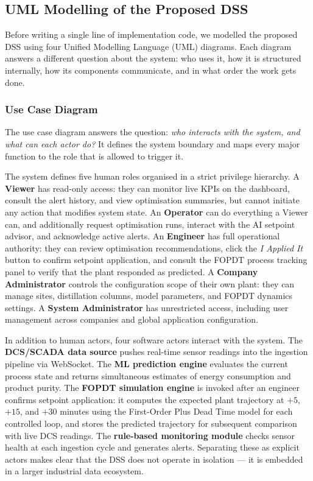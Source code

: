 \subsection{UML Modelling of the Proposed DSS}
\label{sec:uml_modeling}

Before writing a single line of implementation code, we modelled the
proposed DSS using four Unified Modelling Language (UML) diagrams.
Each diagram answers a different question about the system: who uses
it, how it is structured internally, how its components communicate,
and in what order the work gets done.

\subsubsection{Use Case Diagram}

The use case diagram answers the question: \textit{who interacts with
the system, and what can each actor do?}  It defines the system
boundary and maps every major function to the role that is allowed
to trigger it.

The system defines five human roles organised in a strict privilege
hierarchy.  A \textbf{Viewer} has read-only access: they can monitor
live KPIs on the dashboard, consult the alert history, and view
optimisation summaries, but cannot initiate any action that modifies
system state.  An \textbf{Operator} can do everything a Viewer can,
and additionally request optimisation runs, interact with the AI
setpoint advisor, and acknowledge active alerts.  An
\textbf{Engineer} has full operational authority: they can review
optimisation recommendations, click the \textit{I Applied It} button
to confirm setpoint application, and consult the FOPDT process
tracking panel to verify that the plant responded as predicted.  A
\textbf{Company Administrator} controls the configuration scope of
their own plant: they can manage sites, distillation columns, model
parameters, and FOPDT dynamics settings.  A \textbf{System
Administrator} has unrestricted access, including user management
across companies and global application configuration.

In addition to human actors, four software actors interact with the
system.  The \textbf{DCS/SCADA data source} pushes real-time sensor
readings into the ingestion pipeline via WebSocket.  The
\textbf{ML prediction engine} evaluates the current process state
and returns simultaneous estimates of energy consumption and product
purity.  The \textbf{FOPDT simulation engine} is invoked after an
engineer confirms setpoint application: it computes the expected
plant trajectory at $+5$, $+15$, and $+30$ minutes using the
First-Order Plus Dead Time model for each controlled loop, and
stores the predicted trajectory for subsequent comparison with live
DCS readings.  The \textbf{rule-based monitoring module} checks
sensor health at each ingestion cycle and generates alerts.
Separating these as explicit actors makes clear that the DSS does
not operate in isolation --- it is embedded in a larger industrial
data ecosystem.

